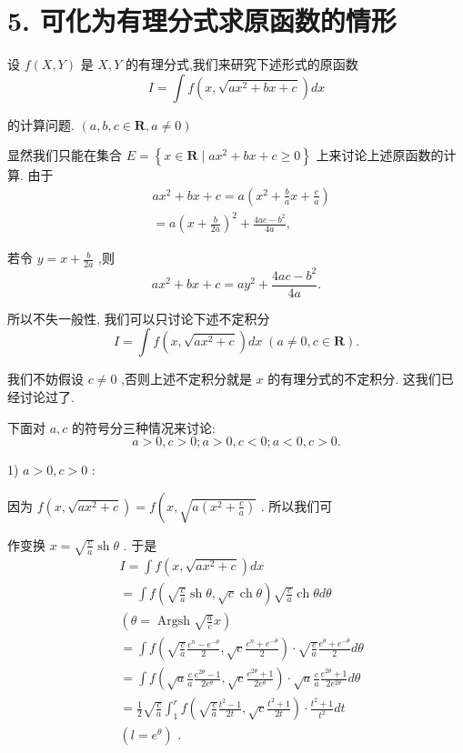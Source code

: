 \section*{5. 可化为有理分式求原函数的情形}

设 $f\left( {X,Y}\right)$ 是 $X,Y$ 的有理分式,我们来研究下述形式的原函数
$$I = \int f\left( {x,\sqrt{a{x}^{2} + {bx} + c}}\right) {dx}$$

的计算问题. $\left( {a,b,c \in  \mathbf{R},a \neq  0}\right)$

显然我们只能在集合 $E = \left\{  {x \in  \mathbf{R} \mid  a{x}^{2} + {bx} + c \geq  0}\right\}$ 上来讨论上述原函数的计算. 由于
\begin{align*}
	&a{x}^{2} + {bx} + c = a\left( {{x}^{2} + \frac{b}{a}x + \frac{c}{a}}\right)\\
	&= a{\left( x + \frac{b}{2a}\right) }^{2} + \frac{{4ac} - {b}^{2}}{4a},
\end{align*}

若令 $y = x + \frac{b}{2a}$ ,则
$$a{x}^{2} + {bx} + c = a{y}^{2} + \frac{{4ac} - {b}^{2}}{4a}.$$

所以不失一般性, 我们可以只讨论下述不定积分
$$I = \int f\left( {x,\sqrt{a{x}^{2} + c}}\right) {dx}\;\left( {a \neq  0,c \in  \mathbf{R}}\right) .$$

我们不妨假设 $c \neq  0$ ,否则上述不定积分就是 $x$ 的有理分式的不定积分. 这我们已经讨论过了.

下面对 $a,c$ 的符号分三种情况来讨论:
$$a > 0,c > 0;a > 0,c < 0;a < 0,c > 0.$$

1) $a > 0,c > 0$ :

因为 $f\left( {x,\sqrt{a{x}^{2} + c}}\right)  = f\left( {x,\sqrt{a\left( {{x}^{2} + \frac{c}{a}}\right) }}\right.$ . 所以我们可

作变换 $x = \sqrt{\frac{c}{a}}\operatorname{sh}\theta$ . 于是
\begin{align*}
	&I = \int f\left( {x,\sqrt{a{x}^{2} + c}}\right) {dx}\\
	&= \int f\left( {\sqrt{\frac{c}{a}}\operatorname{sh}\theta ,\sqrt{c}\operatorname{ch}\theta }\right) \sqrt{\frac{c}{a}}\operatorname{ch}{\theta d\theta }\\
	&\left( {\theta  = \operatorname{Argsh}\sqrt{\frac{a}{c}}x}\right)\\
	&= \int f\left( {\sqrt{\frac{c}{a}}\frac{{e}^{n} - {e}^{-\theta }}{2},\sqrt{c}\frac{{e}^{n} + {e}^{-\theta }}{2}}\right)  \cdot  \sqrt{\frac{c}{a}}\frac{{e}^{\theta } + {e}^{-\theta }}{2}{d\theta }\\
	&= \int f\left( {\sqrt{a}\frac{c}{a}\frac{{e}^{2\theta } - 1}{2{e}^{\theta }},\sqrt{c}\frac{{e}^{2\theta } + 1}{2{e}^{\theta }}}\right)  \cdot  \sqrt{a}\frac{c}{a}\frac{{e}^{2\theta } + 1}{2{e}^{2\theta }}{d\theta }\\
	&= \frac{1}{2}\sqrt{\frac{c}{a}}{\int }_{1}^{r}f\left( {\sqrt{\frac{c}{a}}\frac{{t}^{2} - 1}{2t},\sqrt{c}\frac{{t}^{2} + 1}{2t}}\right)  \cdot  \frac{{t}^{2} + 1}{{t}^{2}}{dt}\\
	&\left( {l = {e}^{\theta }}\right) \text{ . }
\end{align*}

